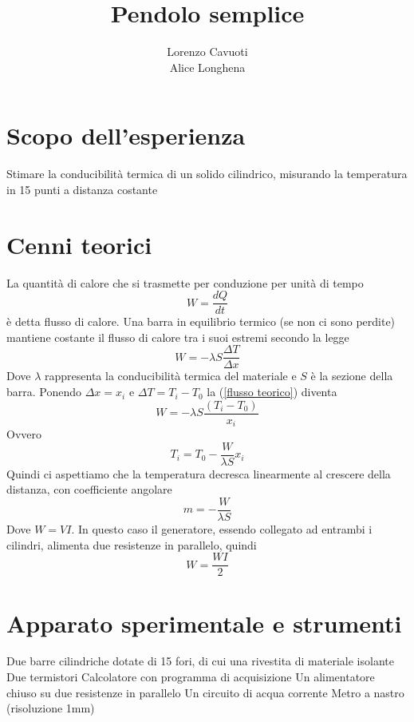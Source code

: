 \documentclass{article}
\title{Pendolo semplice}
\author{Lorenzo Cavuoti \\ Alice Longhena}
\begin{document}
	\maketitle

	\section{Scopo dell'esperienza}
		Stimare la conducibilità termica di un solido cilindrico, misurando la temperatura in 15 punti a distanza costante
	
	\section{Cenni teorici}
		La quantit\`{a} di calore che si trasmette per conduzione per unit\`{a} di tempo
		\begin{equation}
			W = \frac{dQ}{dt}
		\end{equation}
		\`{e} detta flusso di calore. Una barra in equilibrio termico (se non ci sono perdite) mantiene costante il flusso di calore tra i suoi estremi secondo la legge
		\begin{equation}
			W = -\lambda S\frac{\Delta T}{\Delta x}
			\label{flusso teorico}
		\end{equation}
		Dove $\lambda$ rappresenta la conducibilit\`{a} termica del materiale e $S$ \`{e} la sezione della barra. Ponendo $\Delta x = x_i$ e $\Delta T = T_i - T_0$ la (\ref{flusso teorico}) diventa
		\begin{equation}
			W = -\lambda S\frac{(T_i-T_0)}{x_i}
		\end{equation}
		Ovvero
		\begin{equation}
			T_i = T_0 - \frac{W}{\lambda S}x_i
		\end{equation}
		Quindi ci aspettiamo che la temperatura decresca linearmente al crescere della distanza, con coefficiente angolare
		\begin{equation}
			m=-\frac{W}{\lambda S}
		\end{equation}
		Dove $W = VI$.
		In questo caso il generatore, essendo collegato ad entrambi i cilindri, alimenta due resistenze in parallelo, quindi
		\begin{equation}
			W=\frac{WI}{2}
		\end{equation}
	
	\section{Apparato sperimentale e strumenti}
		Due barre cilindriche dotate di 15 fori, di cui una rivestita di materiale isolante
		Due termistori
		Calcolatore con programma di acquisizione
		Un alimentatore chiuso su due resistenze in parallelo
		Un circuito di acqua corrente
		Metro a nastro (risoluzione 1mm)
	
\end{document}
